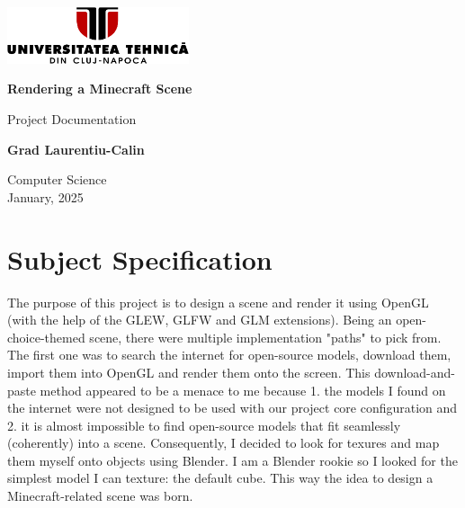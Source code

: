 \documentclass[12pt]{article}
\begin{document}
	\begin{titlepage}
		\centering
		
		\includegraphics[width=0.4\textwidth]{Resources/logo_utcn.png}\\
		\vspace*{6cm}
		
		\Huge
		\textbf{Rendering a Minecraft Scene}
		
		\vspace{0.5cm}
		\Large
		Project Documentation
		
		\vspace{1.5cm}
		
		\textbf{Grad Laurentiu-Calin}\\
		
		\vfill
		
		\Large
		Computer Science\\
		January, 2025\\
		
	\end{titlepage}
	
	\newpage
	
	\tableofcontents
	
	\newpage
	
	\section{Subject Specification}
	
	The purpose of this project is to design a scene and render it using OpenGL (with the help of the GLEW, GLFW and GLM extensions). Being an open-choice-themed scene, there were multiple implementation "paths" to pick from. The first one was to search the internet for open-source models, download them, import them into OpenGL and render them onto the screen. This download-and-paste method appeared to be a menace to me because 1. the models I found on the internet were not designed to be used with our project core configuration and 2. it is almost impossible to find open-source models that fit seamlessly (coherently) into a scene. Consequently, I decided to look for texures and map them myself onto objects using Blender. I am a Blender rookie so I looked for the simplest model I can texture: the default cube. This way the idea to design a Minecraft-related scene was born.
	
\end{document}
